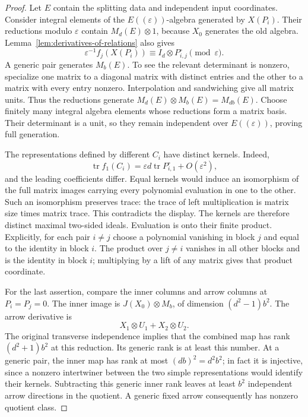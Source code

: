 \documentclass[11pt]{article}
\theoremstyle{definition}
\theoremstyle{remark}
\numberwithin{equation}{section}
\begin{document}
\begin{proof}
Let $E$ contain the splitting data and independent input coordinates.
Consider integral elements of the $E((\varepsilon))$-algebra
generated by $X(P_i)$.  Their reductions modulo $\varepsilon$
contain $M_d(E)\otimes1$, because $X_0$ generates the old algebra.
Lemma~\ref{lem:derivatives-of-relations} also gives
\[
 \varepsilon^{-1}f_j(X(P_i))
 \equiv I_d\otimes P_{i,j}^{\circ}\pmod\varepsilon.
\]
A generic pair generates $M_b(E)$.  To see the relevant determinant
is nonzero, specialize one matrix to a diagonal matrix with distinct
entries and the other to a matrix with every entry nonzero.
Interpolation and sandwiching give all matrix units.  Thus the
reductions generate $M_d(E)\otimes M_b(E)=M_{db}(E)$.
Choose finitely many integral algebra elements whose reductions
form a matrix basis.  Their determinant is a unit, so they remain
independent over $E((\varepsilon))$, proving full generation.

The representations defined by different $C_i$ have distinct kernels.
Indeed,
\[
 \operatorname{tr}f_1(C_i)
  =\varepsilon d\operatorname{tr}P_{i,1}^{\circ}
    +O(\varepsilon^2),
\]
and the leading coefficients differ.  Equal kernels would induce an
isomorphism of the full matrix images carrying every polynomial
evaluation in one to the other.  Such an isomorphism preserves trace:
the trace of left multiplication is matrix size times matrix trace.
This contradicts the display.
The kernels are therefore distinct maximal two-sided ideals.
Evaluation is onto their finite product.  Explicitly, for each pair
$i\ne j$ choose a polynomial vanishing in block $j$ and equal to
the identity in block $i$.  The product over $j\ne i$ vanishes in
all other blocks and is the identity in block $i$; multiplying by
a lift of any matrix gives that product coordinate.

For the last assertion, compare the inner columns and arrow columns
at $P_i=P_j=0$.  The inner image is
$J(X_0)\otimes M_b$, of dimension $(d^2-1)b^2$.  The arrow derivative
is
\[
 X_1\otimes U_1+X_2\otimes U_2.
\]
The original transverse independence implies that the combined map
has rank $(d^2+1)b^2$ at this reduction.  Its generic rank is at
least this number.  At a generic pair, the inner map has rank at
most $(db)^2=d^2b^2$; in fact it is injective, since a nonzero
intertwiner between the two simple representations would identify
their kernels.  Subtracting this generic inner rank leaves at least
$b^2$ independent arrow directions in the quotient.  A generic
fixed arrow consequently has nonzero quotient class.
\end{proof}
\end{document}
